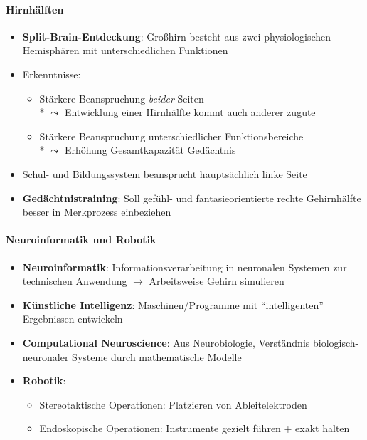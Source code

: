 \paragraph{Hirnhälften}
\begin{itemize}
  \item \textbf{Split-Brain-Entdeckung}: Großhirn besteht aus zwei physiologischen Hemisphären mit unterschiedlichen Funktionen
  \item Erkenntnisse:
  \begin{itemize}
    \item Stärkere Beanspruchung \emph{beider} Seiten \\* \( \leadsto \) Entwicklung einer Hirnhälfte kommt auch anderer zugute
    \item Stärkere Beanspruchung unterschiedlicher Funktionsbereiche \\* \( \leadsto \) Erhöhung Gesamtkapazität Gedächtnis
  \end{itemize}
  \item Schul- und Bildungssystem beansprucht hauptsächlich linke Seite
  \item \textbf{Gedächtnistraining}: Soll gefühl- und fantasieorientierte rechte Gehirnhälfte besser in Merkprozess einbeziehen
\end{itemize}

\paragraph{Neuroinformatik und Robotik}
\begin{itemize}
  \item \textbf{Neuroinformatik}: Informationsverarbeitung in neuronalen Systemen zur technischen Anwendung \( \to \) Arbeitsweise Gehirn simulieren
  \item \textbf{Künstliche Intelligenz}: Maschinen/Programme mit ``intelligenten'' Ergebnissen entwickeln
  \item \textbf{Computational Neuroscience}: Aus Neurobiologie, Verständnis biologisch-neuronaler Systeme durch mathematische Modelle
  \item \textbf{Robotik}:
  \begin{itemize}
    \item Stereotaktische Operationen: Platzieren von Ableitelektroden
    \item Endoskopische Operationen: Instrumente gezielt führen + exakt halten 
  \end{itemize}
\end{itemize}